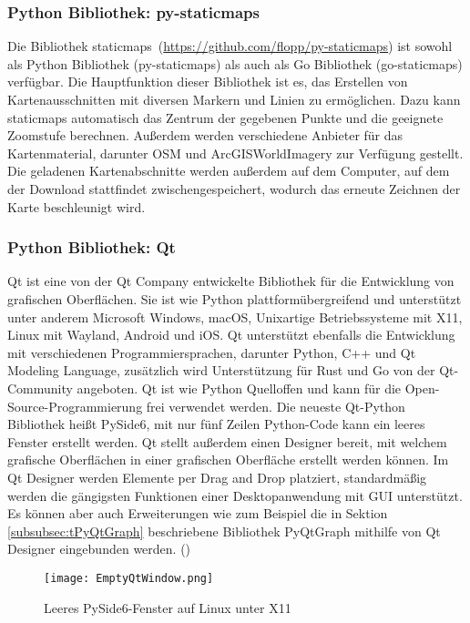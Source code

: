 \subsubsection{Python Bibliothek: py-staticmaps}
\label{subsubsec:tStaticmaps}
Die Bibliothek \glqq staticmaps\grqq\ (\url{https://github.com/flopp/py-staticmaps}) ist sowohl als Python Bibliothek (py-staticmaps) als auch als Go Bibliothek (go-staticmaps) verfügbar. Die Hauptfunktion dieser Bibliothek ist es, das Erstellen von Kartenausschnitten mit diversen Markern und Linien zu ermöglichen. Dazu kann staticmaps automatisch das Zentrum der gegebenen Punkte und die geeignete Zoomstufe berechnen. Außerdem werden verschiedene Anbieter für das Kartenmaterial, darunter \ac{OSM} und ArcGISWorldImagery zur Verfügung gestellt. Die geladenen Kartenabschnitte werden außerdem auf dem Computer, auf dem der Download stattfindet zwischengespeichert, wodurch das erneute Zeichnen der Karte beschleunigt wird. 

\subsubsection{Python Bibliothek: Qt}
\label{subsubsec:tQt}
Qt ist eine von der Qt Company entwickelte Bibliothek für die Entwicklung von grafischen Oberflächen. Sie ist wie Python plattformübergreifend und unterstützt unter anderem Microsoft Windows, macOS, Unixartige Betriebssysteme mit X11, Linux mit Wayland, Android und iOS. Qt unterstützt ebenfalls die Entwicklung mit verschiedenen Programmiersprachen, darunter Python, C++ und Qt Modeling Language, zusätzlich wird Unterstützung für Rust und Go von der Qt-Community angeboten. Qt ist wie Python Quelloffen und kann für die Open-Source-Programmierung frei verwendet werden. Die neueste Qt-Python Bibliothek heißt PySide6, mit nur fünf Zeilen Python-Code kann ein leeres Fenster erstellt werden. Qt stellt außerdem einen Designer bereit, mit welchem grafische Oberflächen in einer grafischen Oberfläche erstellt werden können. Im Qt Designer werden Elemente per Drag and Drop platziert, standardmäßig werden die gängigsten Funktionen einer Desktopanwendung mit \ac{GUI} unterstützt. Es können aber auch Erweiterungen wie zum Beispiel die in Sektion \ref{subsubsec:tPyQtGraph} beschriebene Bibliothek PyQtGraph mithilfe von Qt Designer eingebunden werden.
(\cite{QtDocs})
\begin{figure}[h]
\centering
\texttt{[image: EmptyQtWindow.png]}
\caption{Leeres PySide6-Fenster auf Linux unter X11}
\label{fig:EmptyQtWindow}
\end{figure}

